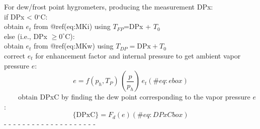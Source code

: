 \documentclass[
  english,
]{book}
\begin{document}
For dew/frost point hygrometers, producing the measurement DPx:\\
\hspace*{0.333em}\hspace*{0.333em}\hspace*{0.333em}\hspace*{0.333em}if
DPx \textless{} 0\(^\circ\)C:\\
\hspace*{0.333em}\hspace*{0.333em}\hspace*{0.333em}\hspace*{0.333em}\hspace*{0.333em}\hspace*{0.333em}\hspace*{0.333em}\hspace*{0.333em}obtain
\(e_{t}\) from @ref(eq:MKi) using \(T_{FP}\)=DPx + \(T_{0}\)\\
\hspace*{0.333em}\hspace*{0.333em}\hspace*{0.333em}\hspace*{0.333em}else
(i.e., DPx \(\geq 0^\circ\)C):\\
\hspace*{0.333em}\hspace*{0.333em}\hspace*{0.333em}\hspace*{0.333em}\hspace*{0.333em}\hspace*{0.333em}\hspace*{0.333em}\hspace*{0.333em}obtain
\(e_{t}\) from @ref(eq:MKw) using \(T_{DP}=\mathrm{DPx}+T_{0}\)\\
\hspace*{0.333em}\hspace*{0.333em}\hspace*{0.333em}\hspace*{0.333em}correct
\(e_{t}\) for enhancement factor and internal pressure to get ambient
vapor pressure \(e\):\\
\begin{equation}
e=f(p_{h},T_{P})\,(\frac{p}{p_{h}})\,e_t
(\#eq:ebox)
\end{equation} ~~~~obtain DPxC by finding the dew point corresponding to
the vapor pressure \(e\):\\
\begin{equation}
\mathrm{\{DPxC\}} = F_{d}(e) 
(\#eq:DPxCbox)
\end{equation} - - - - - - - - - - - - - - - - - - - -\\
\end{document}
